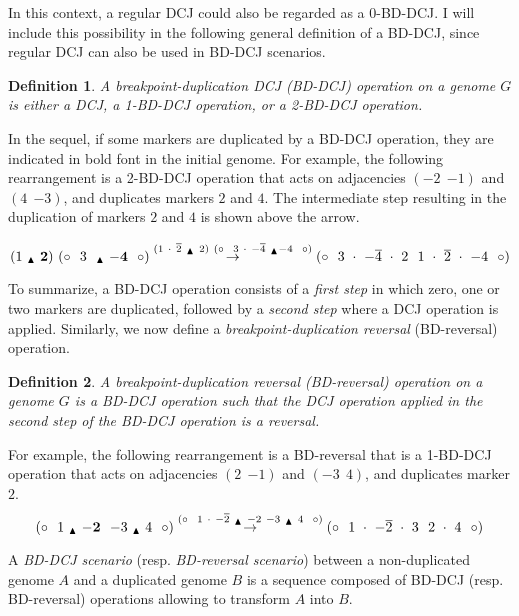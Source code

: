 \documentclass[11pt,final,twoside,nofrench]{thlifl}
\newcommand{\snd}[1]{ \ensuremath{\overline{#1}} }
\newcommand{\msnd}[1]{ \ensuremath{{-\overline{#1}}} }
\newcommand{\breakpoint}{ \textsubscript{$\textcolor{black}{\blacktriangle}$} }
\newtheorem{definition}{Definition}
\begin{document}
In this context, a regular DCJ could also be regarded as a 0-BD-DCJ. I will include this possibility in the following general definition of a BD-DCJ, since regular DCJ can also be used in BD-DCJ scenarios.

\begin{definition}
A \emph{breakpoint-duplication DCJ} (BD-DCJ) operation on a genome $G$ is 
either a DCJ, a 1-BD-DCJ operation, or a 2-BD-DCJ operation.
\end{definition}

In the sequel, if some markers are duplicated by a BD-DCJ operation, they 
are indicated in bold font in the initial genome. 
For example, the following rearrangement is a 2-BD-DCJ operation that acts 
on adjacencies $({-2}~~{-1})$ and $(4~~{-3})$, and duplicates markers $2$ and 
$4$. The intermediate step resulting in the duplication of markers $2$ and $4$
is shown above the arrow.

$$ (1~\breakpoint~\mathbf{2}) ~ (\circ~~3~~\breakpoint ~\mathbf{-4}~~\circ) \overset{(1~\cdot~\snd{2}~\breakpoint~2) ~ (\circ~~3~\cdot~\msnd{4}~\breakpoint -4~~\circ)}{\rightarrow} (\circ~~3~\cdot~\msnd{4}~\cdot~2~~1~\cdot~\snd{2}~\cdot~{-4}~~\circ)$$

To summarize, a BD-DCJ operation consists of a \emph{first step} in which
zero, one or two markers are duplicated, followed by a \emph{second step} where
a  DCJ operation is applied. Similarly, we now define a 
\emph{breakpoint-duplication reversal} (BD-reversal) operation.

\begin{definition}
A \emph{breakpoint-duplication reversal} (BD-reversal) operation on a genome 
$G$ is a BD-DCJ operation such that the DCJ operation applied in the second 
step of the BD-DCJ operation is a reversal.
\end{definition}

For example, the following rearrangement is a BD-reversal that is a 
1-BD-DCJ operation that acts on adjacencies $(2~~{-1})$ and $({-3}~~4)$, 
and duplicates marker $2$.
$$ (\circ~~1~\breakpoint~\mathbf{-2}~~{-3}~\breakpoint~4~~\circ)\overset{(\circ~~1~\cdot~{-\snd{2}}~\breakpoint~{-2}~{-3}~\breakpoint~4~~\circ)}{\rightarrow} (\circ~~1~\cdot~{-\snd{2}}~\cdot~3~~2~\cdot~4~~\circ) $$

A \emph{BD-DCJ scenario} (resp. \emph{BD-reversal scenario}) between a 
non-duplicated genome $A$ and a duplicated genome $B$ is a sequence composed 
of BD-DCJ (resp. BD-reversal) operations allowing to transform $A$ into $B$.
\end{document}
